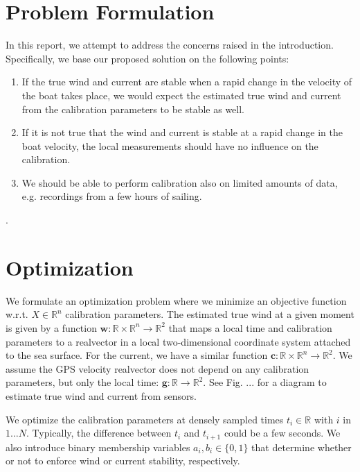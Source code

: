 \documentclass{article}
\newcommand{\realvec}[1]{\mathbf{#1}}
\newcommand{\realnumber}{\mathbb{R}}
\begin{document}
\section{Problem Formulation}
In this report, we attempt to address the concerns raised in the introduction. Specifically, we base our proposed solution on the following points:
\begin{enumerate}
 \item If the true wind and current are stable when a rapid change in the velocity of the boat takes place, we would expect the estimated true wind and current from the calibration parameters to be stable as well.
 \item If it is not true that the wind and current is stable at a rapid change in the boat velocity, the local measurements should have no influence on the calibration.
 \item We should be able to perform calibration also on limited amounts of data, e.g. recordings from a few hours of sailing.
\end{enumerate}.

\section{Optimization}
We formulate an optimization problem where we minimize an objective function w.r.t. $X \in \realnumber^n$ calibration parameters. The estimated true wind at a given moment is given by a function $\realvec{w}: \realnumber \times \realnumber^n \rightarrow \realnumber^2$ that maps a local time and calibration parameters to a realvector in a local two-dimensional coordinate system attached to the sea surface. For the current, we have a similar function $\realvec{c}: \realnumber \times \realnumber^n \rightarrow \realnumber^2$. We assume the GPS velocity realvector does not depend on any calibration parameters, but only the local time: $\realvec{g}: \realnumber \rightarrow \realnumber^2$. See Fig. ... for a diagram to estimate true wind and current from sensors.

We optimize the calibration parameters at densely sampled times $t_i \in \realnumber$ with $i$ in $1 \ldots N$. Typically, the difference between $t_i$ and $t_{i+1}$ could be a few seconds. We also introduce binary membership variables $a_i, b_i \in \{0, 1\}$ that determine whether or not to enforce wind or current stability, respectively.
\end{document}

